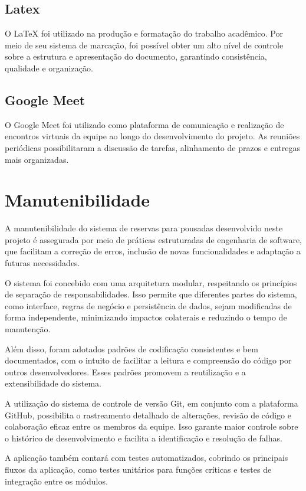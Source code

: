 \documentclass[
	12pt,				%
	openany,			%
	twoside,			%
	a4paper,			%
	english,			%
	french,				%
	spanish,			%
	brazil				%
	]{abntex2}
\begin{document}
\subsection{Latex}
O LaTeX foi utilizado na produção e formatação do trabalho acadêmico. Por meio de seu sistema de marcação, foi possível obter um alto nível de controle sobre a estrutura e apresentação do documento, garantindo consistência, qualidade e organização.

\subsection{Google Meet}
O Google Meet foi utilizado como plataforma de comunicação e realização de encontros virtuais da equipe ao longo do desenvolvimento do projeto. As reuniões periódicas possibilitaram a discussão de tarefas, alinhamento de prazos e entregas mais organizadas.

\section{Manutenibilidade}
A manutenibilidade do sistema de reservas para pousadas desenvolvido neste projeto é assegurada por meio de práticas estruturadas de engenharia de software, que facilitam a correção de erros, inclusão de novas funcionalidades e adaptação a futuras necessidades.

O sistema foi concebido com uma arquitetura modular, respeitando os princípios de separação de responsabilidades. Isso permite que diferentes partes do sistema, como interface, regras de negócio e persistência de dados, sejam modificadas de forma independente, minimizando impactos colaterais e reduzindo o tempo de manutenção.

Além disso, foram adotados padrões de codificação consistentes e bem documentados, com o intuito de facilitar a leitura e compreensão do código por outros desenvolvedores. Esses padrões promovem a reutilização e a extensibilidade do sistema.

A utilização do sistema de controle de versão Git, em conjunto com a plataforma GitHub, possibilita o rastreamento detalhado de alterações, revisão de código e colaboração eficaz entre os membros da equipe. Isso garante maior controle sobre o histórico de desenvolvimento e facilita a identificação e resolução de falhas.

A aplicação também contará com testes automatizados, cobrindo os principais fluxos da aplicação, como testes unitários para funções críticas e testes de integração entre os módulos.
\end{document}
